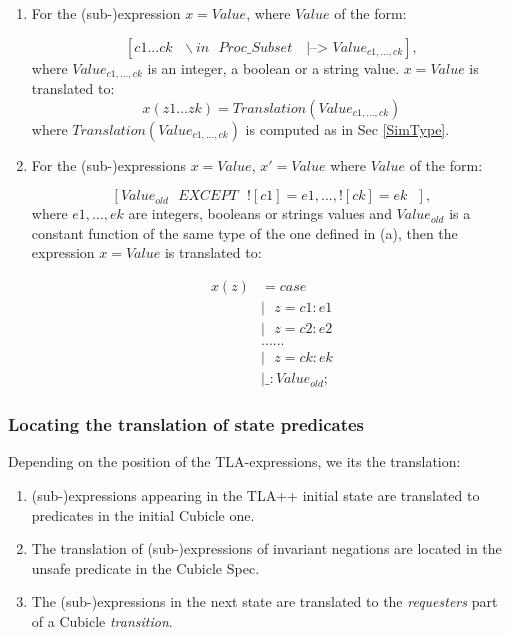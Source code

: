 \documentclass{article}
\theoremstyle{plain}
\numberwithin{equation}{section}
\begin{document}
\begin{enumerate} 
\item  For  the (sub-)expression \emph{$x=Value$}, where \emph{$Value$} of the form:

$$ [c1 ... ck \text{ }\backslash in \text{ } Proc\_Subset \text{ }  \text{  |-->  } Value_{c1,\dots,ck} ],$$
 where $Value_{c1,\dots,ck}$ is an integer, a boolean or a string value. \emph{$x=Value$} is translated to: 
 $$ x(z1 ... zk) = Translation(Value_{c1,\dots,ck})  $$
 where $Translation(Value_{c1,\dots,ck})$ is computed as in Sec \ref{SimType}.

\item  For  the (sub-)expressions \emph{$x=Value$}, \emph{$x'=Value$} where \emph{$Value$} of the form:

$$ [Value_{old}  \text{ } EXCEPT \text{ } ![c1] =e1, ..., ![ck] =ek \text{ }  ],$$
 where $e1,\dots,ek$ are integers,  booleans or strings values and $Value_{old}$ is a constant function of the same type of the one defined in (a), then the expression \emph{$x=Value$} is translated to: 

\begin{align*}
x(z) &= case\\
& | \text{ } z = c1 : e1 \\
& | \text{ } z = c2 : e2 \\
&  ... ... \\
& |\text{ }  z = ck : ek \\
& | \_ : Value_{old};
\end{align*}



 
\end{enumerate} 


\subsubsection{Locating  the translation of state predicates}

Depending on the position of the TLA-expressions,  we its the translation: 

\begin{enumerate}
\item  (sub-)expressions appearing in the TLA++ initial state are translated to  predicates  in the initial Cubicle one.   
\item The translation of (sub-)expressions of invariant negations are located in the unsafe predicate in the Cubicle Spec.  
\item The (sub-)expressions in the next state are translated to the \emph{requesters} part of a Cubicle \emph{transition}. 


\end{enumerate}
\end{document}
